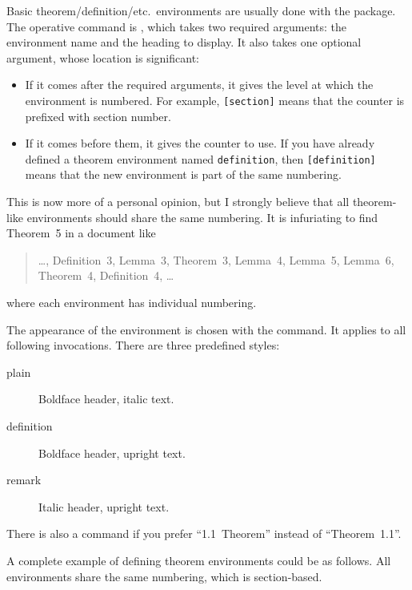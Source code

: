 Basic theorem/definition/etc.\ environments are usually done with the  package.
The operative command is , which takes two required arguments:
the environment name and the heading to display.
It also takes one optional argument, whose location is significant:
\begin{itemize}
\item If it comes after the required arguments,
    it gives the level at which the environment is numbered.
    For example, \verb|[section]| means that the counter is prefixed with section number.
\item If it comes before them, it gives the counter to use.
    If you have already defined a theorem environment named \verb|definition|,
    then \verb|[definition]| means that the new environment is part of the same numbering.
\end{itemize}

\begin{practices}
This is now more of a personal opinion,
but I strongly believe that all theorem-like environments should share the same numbering.
It is infuriating to find Theorem~5 in a document like
\begin{quote}
    \dots, Definition~3, Lemma~3, Theorem~3, Lemma~4, Lemma~5, Lemma~6, Theorem~4,
    Definition~4, \dots
\end{quote}
where each environment has individual numbering.
\end{practices}

The appearance of the environment is chosen with the  command.
It applies to all following  invocations.
There are three predefined styles:
\begin{description}
\item[plain] Boldface header, italic text.
\item[definition] Boldface header, upright text.
\item[remark] Italic header, upright text.
\end{description}
%
There is also a  command if you prefer ``1.1~Theorem'' instead of ``Theorem~1.1''.

A complete example of defining theorem environments could be as follows.
All environments share the same numbering, which is section-based.
%
\begin{ExampleCode}
\theoremstyle{plain}
\newtheorem{theorem}{Theorem}[section]
\newtheorem{lemma}[theorem]{Lemma}
\newtheorem{corollary}[theorem]{Corollary}

\theoremstyle{remark}
\newtheorem{remark}[theorem]{Remark}
\newtheorem{example}[theorem]{Example}

\theoremstyle{definition}
\newtheorem{definition}[theorem]{Definition}
\end{ExampleCode}

